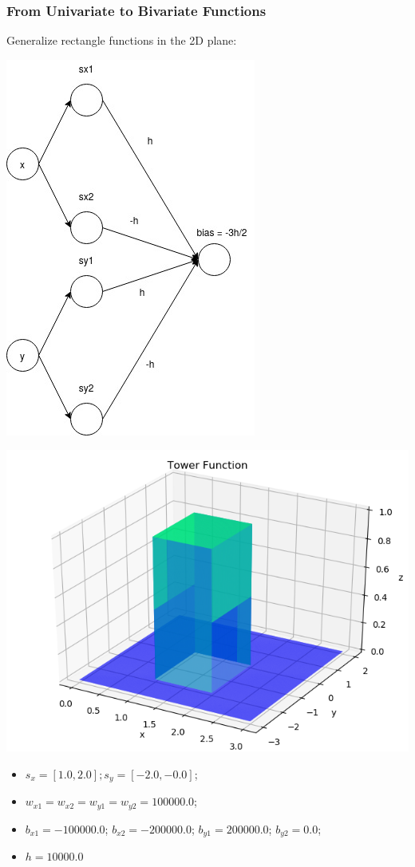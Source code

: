 \documentclass[11pt]{beamer}
\begin{document}
\begin{frame}[t]
\frametitle{From Univariate to Bivariate Functions}
Generalize rectangle functions in the 2D plane:
\begin{minipage}{0.4\textwidth}
\begin{center}
\includegraphics[scale=0.3]{nnTowerFunction.jpg}
\end{center}
\end{minipage}
\hfill
\begin{minipage}{0.5\textwidth}
\begin{center}
\includegraphics[scale=0.3]{TowerFunction.png}
\end{center}
\end{minipage}
{\small
\begin{itemize}
    \item $s_x = [1.0, 2.0]; s_y = [-2.0, -0.0]$;
    \item $w_{x1} = w_{x2} = w_{y1} = w_{y2} = 100000.0$;
    \item $b_{x1} = -100000.0$; $b_{x2} = -200000.0$; $b_{y1} = 200000.0$; $b_{y2} = 0.0$;
    \item $h = 10000.0$
\end{itemize}
}
\end{frame}
\end{document}
